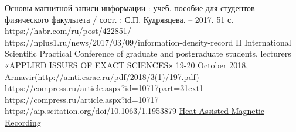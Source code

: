 \documentclass[a4paper,14pt]{extreport}
\begin{document}
\begin{thebibliography}{9}
 Основы магнитной записи информации : учеб. пособие для студентов физического факультета / сост. : С.П. Кудрявцева. – 2017. 51 с.
 https://habr.com/ru/post/422851/
 https://nplus1.ru/news/2017/03/09/information-density-record
 II International Scientific Practical Conference of graduate and postgraduate students,
lecturers «APPLIED ISSUES OF EXACT SCIENCES»
19-20 October 2018, Armavir(http://amti.esrae.ru/pdf/2018/3(1)/197.pdf)
 https://compress.ru/article.aspx?id=10717part=31ext1
 https://compress.ru/article.aspx?id=10717
 https://aip.scitation.org/doi/10.1063/1.1953879
 \href{https://www.researchgate.net/publication/224354512_Heat_Assisted_Magnetic_Recording}{Heat Assisted Magnetic Recording}
\end{thebibliography}
\end{document}
